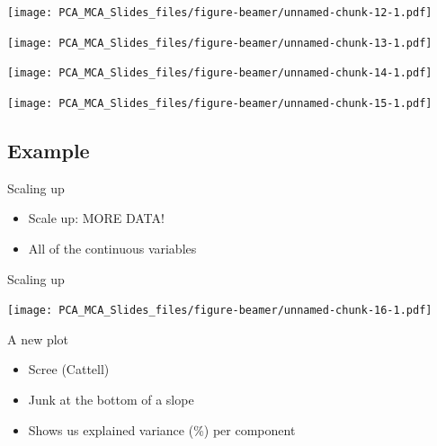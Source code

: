 \documentclass[
  ignorenonframetext,
]{beamer}
\providecommand{\tightlist}{%
  \setlength{\itemsep}{0pt}\setlength{\parskip}{0pt}}
\begin{document}
\begin{frame}

\texttt{[image: PCA\_MCA\_Slides\_files/figure-beamer/unnamed-chunk-12-1.pdf]}

\end{frame}

\begin{frame}

\texttt{[image: PCA\_MCA\_Slides\_files/figure-beamer/unnamed-chunk-13-1.pdf]}

\end{frame}

\begin{frame}

\texttt{[image: PCA\_MCA\_Slides\_files/figure-beamer/unnamed-chunk-14-1.pdf]}

\end{frame}

\begin{frame}

\texttt{[image: PCA\_MCA\_Slides\_files/figure-beamer/unnamed-chunk-15-1.pdf]}

\end{frame}

\hypertarget{example}{%
\subsection{Example}\label{example}}

\begin{frame}{Scaling up}
\protect\hypertarget{scaling-up}{}

\begin{itemize}[<+->]
\tightlist
\item
  Scale up: MORE DATA!
\item
  All of the continuous variables
\end{itemize}

\end{frame}

\begin{frame}{Scaling up}
\protect\hypertarget{scaling-up-1}{}

\texttt{[image: PCA\_MCA\_Slides\_files/figure-beamer/unnamed-chunk-16-1.pdf]}

\end{frame}

\begin{frame}{A new plot}
\protect\hypertarget{a-new-plot}{}

\begin{itemize}[<+->]
\tightlist
\item
  Scree (Cattell)
\item
  Junk at the bottom of a slope
\item
  Shows us explained variance (\%) per component
\end{itemize}

\end{frame}
\end{document}
